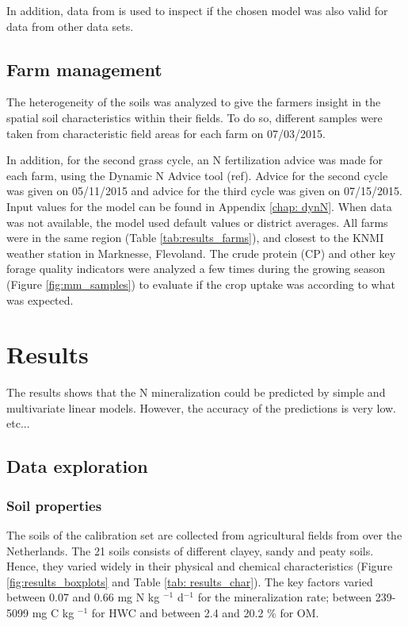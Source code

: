 \documentclass[10pt,twoside,dutch,english]{report}
\begin{document}
In addition, data from\citet{Ros2011} is used to inspect if the chosen model was also valid for data from other data sets. 


\section{Farm management }
The heterogeneity of the soils was analyzed to give the farmers insight in the spatial soil characteristics within their fields. To do so, different samples were taken from characteristic field areas for each farm on 07/03/2015. 

In addition, for the second grass cycle, an N fertilization advice was made for each farm, using the Dynamic N Advice tool (ref). Advice for the second cycle was given on 05/11/2015  and advice for the third cycle was given on 07/15/2015. Input values for the model can be found in Appendix \ref{chap: dynN}. When data was not available, the model used default values or district averages. All farms were in the same region (Table \ref{tab:results_farms}), and closest to the KNMI weather station in Marknesse, Flevoland. The crude protein (CP) and other key forage quality indicators were analyzed a few times during the growing season (Figure \ref{fig:mm_samples}) to evaluate if the crop uptake was according to what was expected. 



\chapter{Results}

The results shows that the N mineralization could be predicted by simple and multivariate linear models. However, the accuracy of the predictions is very low. etc... %
\section{Data exploration}
\subsection{Soil properties}
The soils of the calibration set are collected from agricultural fields from over the Netherlands. The 21 soils consists of different clayey, sandy and peaty soils. Hence, they varied widely in their physical and chemical characteristics (Figure \ref{fig:results_boxplots} and Table \ref{tab: results_char}). The key factors varied between 0.07 and 0.66 mg N kg $^{-1}$ d$^{-1}$ for the mineralization rate; between 239-5099 mg C kg $^{-1}$ for HWC and between 2.4 and 20.2 \% for OM. 
\end{document}
